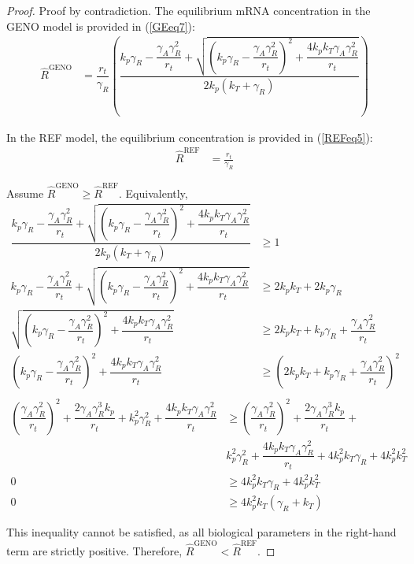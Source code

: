 \documentclass[12pt]{article}
\numberwithin{equation}{section}
\begin{document}
\begin{proof}
  Proof by contradiction. The equilibrium mRNA concentration in the GENO model is provided in (\ref{GEeq7}):
  \begin{align*}
    \hat{R}^{\mathrm{GENO}} &= \dfrac{r_t}{\gamma_R} \left( \dfrac{k_p \gamma_R - \dfrac{\gamma_A \gamma_R^2}{r_t} + \sqrt{\left( k_p \gamma_R - \dfrac{\gamma_A \gamma_R^2}{r_t} \right)^2 + \dfrac{4 k_p k_T \gamma_A \gamma_R^2}{r_t}} }{2 k_p (k_T + \gamma_R)} \right)
  \end{align*}

  \noindent In the REF model, the equilibrium concentration is provided in (\ref{REFeq5}):
  \begin{align*}
    \hat{R}^{\mathrm{REF}} &= \frac{r_t}{\gamma_R}
  \end{align*}

  \noindent Assume $\hat{R}^{\mathrm{GENO}} \geq \hat{R}^{\mathrm{REF}}$. Equivalently,
  \begin{align*}
    \dfrac{k_p \gamma_R - \dfrac{\gamma_A \gamma_R^2}{r_t} + \sqrt{\left( k_p \gamma_R - \dfrac{\gamma_A \gamma_R^2}{r_t} \right)^2 + \dfrac{4 k_p k_T \gamma_A \gamma_R^2}{r_t}} }{2 k_p (k_T + \gamma_R)} &\geq 1\\
    k_p \gamma_R - \dfrac{\gamma_A \gamma_R^2}{r_t} + \sqrt{\left( k_p \gamma_R - \dfrac{\gamma_A \gamma_R^2}{r_t} \right)^2 + \dfrac{4 k_p k_T \gamma_A \gamma_R^2}{r_t}} &\geq 2 k_p k_T + 2 k_p \gamma_R\\
    \sqrt{\left( k_p \gamma_R - \dfrac{\gamma_A \gamma_R^2}{r_t} \right)^2 + \dfrac{4 k_p k_T \gamma_A \gamma_R^2}{r_t}} &\geq 2 k_p k_T + k_p \gamma_R + \dfrac{\gamma_A \gamma_R^2}{r_t}\\
    \left( k_p \gamma_R - \dfrac{\gamma_A \gamma_R^2}{r_t} \right)^2 + \dfrac{4 k_p k_T \gamma_A \gamma_R^2}{r_t} &\geq \left( 2 k_p k_T + k_p \gamma_R + \dfrac{\gamma_A \gamma_R^2}{r_t} \right)^2\\
  \end{align*}
  \vspace*{-15mm}
  \begin{align*}
    \left( \dfrac{\gamma_A \gamma_R^2}{r_t} \right)^2 + \dfrac{2 \gamma_A \gamma_R^3 k_p}{r_t} + k_p^2 \gamma_R^2 + \dfrac{4 k_p k_T \gamma_A \gamma_R^2}{r_t} &\geq \left( \dfrac{\gamma_A \gamma_R^2}{r_t} \right)^2 + \dfrac{2 \gamma_A \gamma_R^3 k_p}{r_t} + \\
    &k_p^2 \gamma_R^2 + \dfrac{4 k_p k_T \gamma_A \gamma_R^2}{r_t} + 4 k_p^2 k_T \gamma_R + 4 k_p^2 k_T^2\\
    0 &\geq 4 k_p^2 k_T \gamma_R + 4 k_p^2 k_T^2\\
    0 &\geq 4 k_p^2 k_T (\gamma_R + k_T)
  \end{align*}

  \noindent This inequality cannot be satisfied, as all biological parameters in the right-hand term are strictly positive. Therefore, $\hat{R}^{\mathrm{GENO}} < \hat{R}^{\mathrm{REF}}$.

\end{proof}
\end{document}
